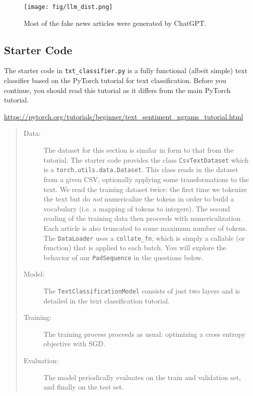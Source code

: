 \documentclass[11pt,addpoints,answers]{exam}
\begin{document}
\begin{questions}
\begin{figure}[b]  
    \centering
    \caption{Most of the fake news articles were generated by ChatGPT.}
    \label{fig:llmdist}    
    \texttt{[image: fig/llm\_dist.png]}
\end{figure}

\subsection*{Starter Code}

The starter code in \lstinline{txt_classifier.py} is a fully functional (albeit simple) text classifier based on the PyTorch tutorial for text classification. Before you continue, you should read this tutorial as it differs from the main PyTorch tutorial.
\begin{center}
{\small
\url{https://pytorch.org/tutorials/beginner/text_sentiment_ngrams_tutorial.html}
}
\end{center}

\begin{quote}
\begin{description}

\item[Data:] The dataset for this section is similar in form to that from the tutorial. The starter code provides the class \lstinline{CsvTextDataset} which is a \lstinline{torch.utils.data.Dataset}. This class reads in the dataset from a given CSV, optionally applying some transformations to the text. 
%
We read the training dataset twice: the first time we tokenize the text but do \emph{not} numericalize the tokens in order to build a vocabulary (i.e. a mapping of tokens to integers). The second reading of the training data then proceeds with numericalization. Each article is also truncated to some maximum number of tokens.
%
The \lstinline{DataLoader} uses a \lstinline{collate_fn}, which is simply a callable (or function) that is applied to each batch. You will explore the behavior of our \lstinline{PadSequence} in the questions below.

\item[Model:] The \lstinline{TextClassificationModel} consists of just two layers and is detailed in the text classification tutorial. 

\item[Training:] The training process proceeds as usual: optimizing a cross entropy objective with SGD. 

\item[Evaluation:] The model periodically evaluates on the train and validation set, and finally on the test set. 
    

\end{description}
\end{quote}
\end{questions}
\end{document}
